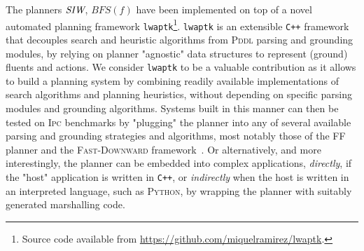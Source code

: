 The planners ${\textit{SIW}}$, $BFS(f)$ have been implemented on top of a novel
automated planning framework \texttt{lwaptk}\footnote{Source code available from
\url{https://github.com/miquelramirez/lwaptk}.}. \texttt{lwaptk} is an extensible \texttt{C++}
framework that decouples search and heuristic algorithms from \textsc{Pddl} parsing and grounding modules, by relying
on planner "agnostic" data structures to represent (ground) fluents and actions.
We consider \texttt{lwaptk} to be a valuable contribution as it allows to build a planning system by combining 
readily available implementations of search algorithms and planning heuristics, without
depending on specific parsing modules and grounding algorithms. Systems built in this manner
can then be tested on \textsc{Ipc} benchmarks by "plugging" the planner into any of several available 
parsing and grounding strategies and algorithms, most notably those of the \textsc{FF}~\cite{hoffmann:ff}
planner and the \textsc{Fast-Downward} framework~\cite{helmert:fd}. Or alternatively, and more interestingly,
the planner can be embedded into complex applications, \emph{directly}, if the "host" application is written in 
\texttt{C++}, or \emph{indirectly} when the host is written in an interpreted language, such as \textsc{Python}, 
by wrapping the planner with suitably generated marshalling code. 
